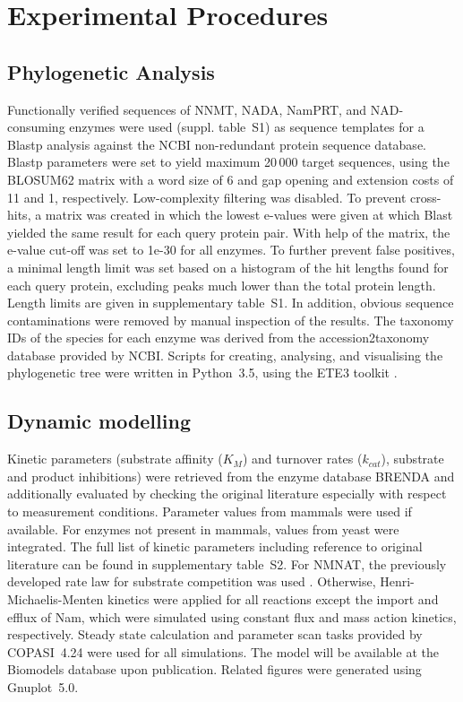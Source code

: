 
\section{Experimental Procedures}

\subsection{Phylogenetic Analysis}
Functionally verified sequences of NNMT, NADA, NamPRT, and NAD-consuming enzymes were used (suppl. table~S1) as sequence templates for a Blastp analysis against the NCBI non-redundant protein sequence database. Blastp parameters were set to yield maximum 20\,000 target sequences, using the BLOSUM62 matrix with a word size of 6 and gap opening and extension costs of 11 and 1, respectively. Low-complexity filtering was disabled. To prevent cross-hits, a matrix was created in which the lowest e-values were given at which Blast yielded the same result for each query protein pair. With help of the matrix, the e-value cut-off was set to 1e-30 for all enzymes. To further prevent false positives, a minimal length limit was set based on a histogram of the hit lengths found for each query protein, excluding peaks much lower than the total protein length. Length limits are given in supplementary table~S1. In addition, obvious sequence contaminations were removed by manual inspection of the results. The taxonomy IDs of the species for each enzyme was derived from the accession2taxonomy database provided by NCBI. Scripts for creating, analysing, and visualising the phylogenetic tree were written in Python~3.5, using the ETE3 toolkit \cite{Huerta-Cepas2016}.


\subsection{Dynamic modelling}

Kinetic parameters (substrate affinity ($K_{M}$) and turnover rates ($k_{cat}$), substrate and product inhibitions) were retrieved from the enzyme database BRENDA and additionally evaluated by checking the original literature especially with respect to measurement conditions. Parameter values from mammals were used if available. For enzymes not present in mammals, values from yeast were integrated. The full list of kinetic parameters including reference to original literature can be found in supplementary table~S2. For NMNAT, the previously developed rate law for substrate competition was used \cite{Schauble2013}. Otherwise, Henri-Michaelis-Menten kinetics were applied for all reactions except the import and efflux of Nam, which were simulated using constant flux and mass action kinetics, respectively. Steady state calculation and parameter scan tasks provided by COPASI~4.24 \cite{Hoops2006} were used for all simulations. The model will be available at the Biomodels database upon publication. Related figures were generated using Gnuplot~5.0.


